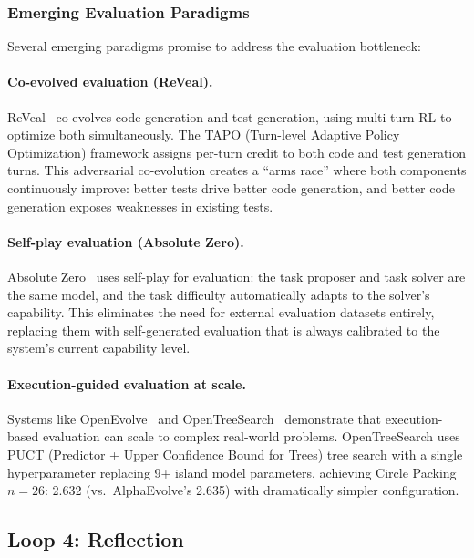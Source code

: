 \subsubsection{Emerging Evaluation Paradigms}

Several emerging paradigms promise to address the evaluation bottleneck:

\paragraph{Co-evolved evaluation (ReVeal).}
ReVeal~\citep{jin2026reveal} co-evolves code generation and test generation, using multi-turn RL to optimize both simultaneously. The TAPO (Turn-level Adaptive Policy Optimization) framework assigns per-turn credit to both code and test generation turns. This adversarial co-evolution creates a ``arms race'' where both components continuously improve: better tests drive better code generation, and better code generation exposes weaknesses in existing tests.

\paragraph{Self-play evaluation (Absolute Zero).}
Absolute Zero~\citep{zhao2025absolutezero} uses self-play for evaluation: the task proposer and task solver are the same model, and the task difficulty automatically adapts to the solver's capability. This eliminates the need for external evaluation datasets entirely, replacing them with self-generated evaluation that is always calibrated to the system's current capability level.

\paragraph{Execution-guided evaluation at scale.}
Systems like OpenEvolve~\citep{openevolve2024} and OpenTreeSearch~\citep{opentreesearch2025} demonstrate that execution-based evaluation can scale to complex real-world problems. OpenTreeSearch uses PUCT (Predictor + Upper Confidence Bound for Trees) tree search with a single hyperparameter replacing 9+ island model parameters, achieving Circle Packing $n=26$: 2.632 (vs.\ AlphaEvolve's 2.635) with dramatically simpler configuration.


\subsection{Loop 4: Reflection}
\label{sec:reflection-loop}

